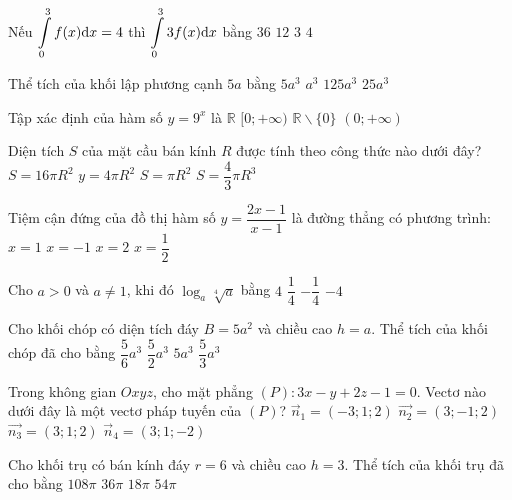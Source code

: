 \begin{ex}%
Nếu $\displaystyle\displaystyle\int\limits_0^3 f(x) \mathrm{d} x=4$ thì $\displaystyle\displaystyle\int\limits_0^3 3 f(x) \mathrm{d} x$ bằng
\choice
{$36$}
{\True $12$}
{$3$}
{$4$}

\end{ex}
\begin{ex}%
Thể tích của khối lập phương cạnh $5 a$ bằng
\choice
{$5 a^3$}
{$a^3$}
{\True $125 a^3$}
{$25 a^3$}

\end{ex}
\begin{ex}%
Tập xác định của hàm số $y=9^{x}$ là
\choice
{\True $\mathbb{R}$}
{$[0;+\infty)$}
{$\mathbb{R} \backslash\{0\}$}
{$(0;+\infty)$}

\end{ex}
\begin{ex}%
Diện tích $S$ của mặt cầu bán kính $R$ được tính theo công thức nào dưới đây?
\choice
{$S=16\pi R^2$}
{\True $y=4\pi R^2$}
{$S=\pi R^2$}
{$S=\dfrac{4}{3} \pi R^3$}

\end{ex}
\begin{ex}%
Tiệm cận đứng của đồ thị hàm số $y=\dfrac{2 x-1}{x-1}$ là đường thẳng có phương trình:
\choice
{\True $x=1$}
{$x=-1$}
{$x=2$}
{$x=\dfrac{1}{2}$}

\end{ex}
\begin{ex}%
Cho $a>0$ và $a \neq 1$, khi đó $\log_a \sqrt[4]{a}$ bằng
\choice
{$4$}
{\True $\dfrac{1}{4}$}
{$-\dfrac{1}{4}$}
{$-4$}

\end{ex}
\begin{ex}%
Cho khối chóp có diện tích đáy $B=5 a^2$ và chiều cao $h=a$. Thể tích của khối chóp đã cho bằng
\choice
{$\dfrac{5}{6} a^3$}
{$\dfrac{5}{2} a^3$}
{$5 a^3$}
{\True $\dfrac{5}{3} a^3$}

\end{ex}
\begin{ex}%
Trong không gian $O x y z$, cho mặt phẳng $(P)\colon 3 x-y+2 z-1=0$. Vectơ nào dưới đây là một vectơ pháp tuyến của $(P)$?
\choice
{$\vec{n}_1=(-3; 1; 2)$}
{\True $\overrightarrow{n_2}=(3;-1; 2)$}
{$\overrightarrow{n_3}=(3; 1; 2)$}
{$\vec{n}_4=(3; 1;-2)$}

\end{ex}
\begin{ex}%
Cho khối trụ có bán kính đáy $r=6$ và chiều cao $h=3$. Thể tích của khối trụ đã cho bằng
\choice
{\True $108\pi$}
{$36\pi$}
{$18\pi$}
{$54\pi$}

\end{ex}
